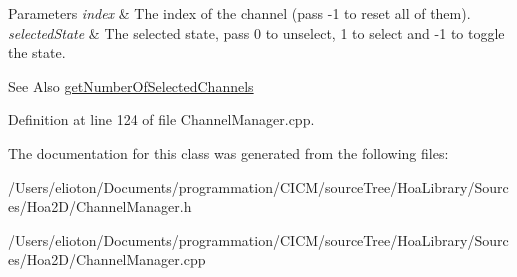 \begin{DoxyParams}{Parameters}
{\em index} & The index of the channel (pass -\/1 to reset all of them). \\
\hline
{\em selected\-State} & The selected state, pass 0 to unselect, 1 to select and -\/1 to toggle the state. \\
\hline
\end{DoxyParams}
\begin{DoxySeeAlso}{See Also}
\hyperlink{class_hoa2_d_1_1_channel_manager_a0f33fda180a50a3b2a144d62801b0f56}{get\-Number\-Of\-Selected\-Channels} 
\end{DoxySeeAlso}


Definition at line 124 of file Channel\-Manager.\-cpp.



The documentation for this class was generated from the following files\-:\begin{DoxyCompactItemize}
\item 
/\-Users/elioton/\-Documents/programmation/\-C\-I\-C\-M/source\-Tree/\-Hoa\-Library/\-Sources/\-Hoa2\-D/Channel\-Manager.\-h\item 
/\-Users/elioton/\-Documents/programmation/\-C\-I\-C\-M/source\-Tree/\-Hoa\-Library/\-Sources/\-Hoa2\-D/Channel\-Manager.\-cpp\end{DoxyCompactItemize}
